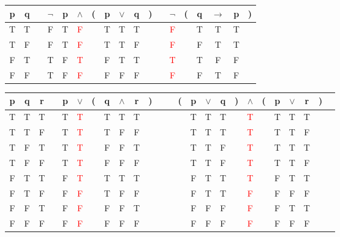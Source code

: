 \begin{Solution}{2.1}
\begin{tasks}
        \task
\begin{tabular}{@{ }c@{ }@{ }c | c@{ }@{ }c@{ }@{ }c@{ }@{ }c@{ }@{}c@{}@{ }c@{ }@{ }c@{ }@{ }c@{ }@{}c@{}@{ }c | c@{ }@{}c@{}@{ }c@{ }@{ }c@{ }@{ }c@{ }@{}c@{ }}
p & q &  & $\lnot$ & p & $\land$ & ( & p & $\lor$ & q & ) &  & $\lnot$ & ( & q & $\rightarrow$ & p & )\\
\hline
T & T &  & F & T & \textcolor{red}{F} &  & T & T & T &  &  & \textcolor{red}{F} &  & T & T & T & \\
T & F &  & F & T & \textcolor{red}{F} &  & T & T & F &  &  & \textcolor{red}{F} &  & F & T & T & \\
F & T &  & T & F & \textcolor{red}{T} &  & F & T & T &  &  & \textcolor{red}{T} &  & T & F & F & \\
F & F &  & T & F & \textcolor{red}{F} &  & F & F & F &  &  & \textcolor{red}{F} &  & F & T & F & \\
\end{tabular}

        \task
\begin{tabular}{@{ }c@{ }@{ }c@{ }@{ }c | c@{ }@{ }c@{ }@{ }c@{ }@{}c@{}@{ }c@{ }@{ }c@{ }@{ }c@{ }@{}c@{}@{ }c | c@{ }@{}c@{}@{ }c@{ }@{ }c@{ }@{ }c@{ }@{}c@{}@{ }c@{ }@{}c@{}@{ }c@{ }@{ }c@{ }@{ }c@{ }@{}c@{}@{ }c}
p & q & r &  & p & $\lor$ & ( & q & $\land$ & r & ) &  &  & ( & p & $\lor$ & q & ) & $\land$ & ( & p & $\lor$ & r & ) & \\
\hline
T & T & T &  & T & \textcolor{red}{T} &  & T & T & T &  &  &  &  & T & T & T &  & \textcolor{red}{T} &  & T & T & T &  & \\
T & T & F &  & T & \textcolor{red}{T} &  & T & F & F &  &  &  &  & T & T & T &  & \textcolor{red}{T} &  & T & T & F &  & \\
T & F & T &  & T & \textcolor{red}{T} &  & F & F & T &  &  &  &  & T & T & F &  & \textcolor{red}{T} &  & T & T & T &  & \\
T & F & F &  & T & \textcolor{red}{T} &  & F & F & F &  &  &  &  & T & T & F &  & \textcolor{red}{T} &  & T & T & F &  & \\
F & T & T &  & F & \textcolor{red}{T} &  & T & T & T &  &  &  &  & F & T & T &  & \textcolor{red}{T} &  & F & T & T &  & \\
F & T & F &  & F & \textcolor{red}{F} &  & T & F & F &  &  &  &  & F & T & T &  & \textcolor{red}{F} &  & F & F & F &  & \\
F & F & T &  & F & \textcolor{red}{F} &  & F & F & T &  &  &  &  & F & F & F &  & \textcolor{red}{F} &  & F & T & T &  & \\
F & F & F &  & F & \textcolor{red}{F} &  & F & F & F &  &  &  &  & F & F & F &  & \textcolor{red}{F} &  & F & F & F &  & \\
\end{tabular}
    \end{tasks}
\end{Solution}

